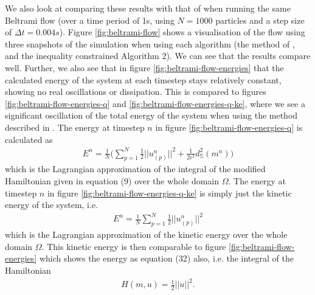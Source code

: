 \documentclass[11pt, oneside]{article}   	%
\newcommand{\dt}{\Delta t}
\newcommand{\Sb}{\mathbb{S}}
\begin{document}
We also look at comparing these results with that of \cite{gallouet2016lagrangian} when running the same Beltrami flow (over a time period of 1s, using \(N = 1000\) particles and a step size of \(\dt = 0.004s\)). Figure \ref{fig:beltrami-flow} shows a visualisation of the flow using three snapshots of the simulation when using each algorithm (the method of \cite{gallouet2016lagrangian}, and the inequality constrained Algorithm 2). We can see that the results compare well. Further, we also see that in figure \ref{fig:beltrami-flow-energies} that the calculated energy of the system at each timestep stays relatively constant, showing no real oscillations or dissipation. This is compared to figures \ref{fig:beltrami-flow-energies-q} and \ref{fig:beltrami-flow-energies-q-ke}, where we see a significant oscillation of the total energy of the system when using the method described in \cite{gallouet2016lagrangian}. The energy at timestep \(n\) in figure \ref{fig:beltrami-flow-energies-q} is calculated as
\begin{align}
E^n = \frac{1}{N} \Big( \sum_{p = 1}^{N} \frac{1}{2} || u^n_{(p)} ||^2 + \frac{1}{2 \epsilon^2} d^2_{\Sb}(m^n) \Big) 
\end{align} 
which is the Lagrangian approximation of the integral of the modified Hamiltonian given in equation (9) over the whole domain \(\Omega\). The energy at timestep \(n\) in figure \ref{fig:beltrami-flow-energies-q-ke} is simply just the kinetic energy of the system, i.e.
\begin{align}
E^n = \frac{1}{N} \sum_{p = 1}^{N} \frac{1}{2} || u^n_{(p)} ||^2
\end{align} 
which is the Lagrangian approximation of the kinetic energy over the whole domain \(\Omega\). This kinetic energy is then comparable to figure \ref{fig:beltrami-flow-energies} which shows the energy as equation (32) also, i.e. the integral of the Hamiltonian
\begin{align}
H(m, u) = \frac{1}{2} || u ||^2.
\end{align}
\end{document}
